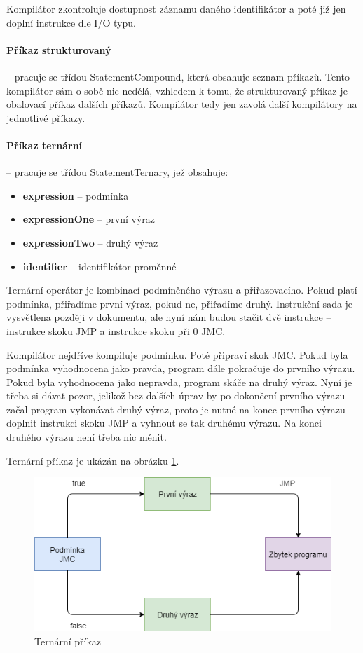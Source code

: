 \documentclass[
12pt,
a4paper,
pdftex,
czech,
titlepage
]{report}
\begin{document}
Kompilátor zkontroluje dostupnost záznamu daného identifikátor a poté již jen doplní instrukce dle I/O typu.

\paragraph{Příkaz strukturovaný} -- pracuje se třídou StatementCompound, která obsahuje seznam příkazů. Tento kompilátor sám o sobě nic nedělá, vzhledem k tomu, že strukturovaný příkaz je obalovací příkaz dalších příkazů. Kompilátor tedy jen zavolá další kompilátory na jednotlivé příkazy.

\paragraph{Příkaz ternární} -- pracuje se třídou StatementTernary, jež obsahuje:
\begin{itemize}
\item \textbf{expression} -- podmínka
\item \textbf{expressionOne} -- první výraz
\item \textbf{expressionTwo} -- druhý výraz
\item \textbf{identifier} -- identifikátor proměnné
\end{itemize}

Ternární operátor je kombinací podmíněného výrazu a přiřazovacího. Pokud platí podmínka, přiřadíme první výraz, pokud ne, přiřadíme druhý. Instrukční sada je vysvětlena později v dokumentu, ale nyní nám budou stačit dvě instrukce -- instrukce skoku JMP a instrukce skoku při 0 JMC. 

Kompilátor nejdříve kompiluje podmínku. Poté připraví skok JMC. Pokud byla podmínka vyhodnocena jako pravda, program dále pokračuje do prvního výrazu. Pokud byla vyhodnocena jako nepravda, program skáče na druhý výraz. Nyní je třeba si dávat pozor, jelikož bez dalších úprav by po dokončení prvního výrazu začal program vykonávat druhý výraz, proto je nutné na konec prvního výrazu doplnit instrukci skoku JMP a vyhnout se tak druhému výrazu. Na konci druhého výrazu není třeba nic měnit.

Ternární příkaz je ukázán na obrázku \ref{statementTernary}.

\begin{figure}[H]
\caption{Ternární příkaz}
\label{statementTernary}
\includegraphics[width=\textwidth]{statementTernary.png}
\end{figure}
\end{document}
